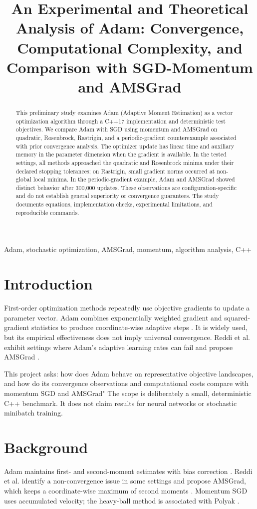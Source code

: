 \documentclass[conference]{IEEEtran}
\title{An Experimental and Theoretical Analysis of Adam: Convergence, Computational Complexity, and Comparison with SGD-Momentum and AMSGrad}
\author{\IEEEauthorblockN{Dario Pomasqui}\IEEEauthorblockA{School of Mathematical and Computational Sciences\\Yachay Tech University\\ECMC1018 Analysis of Algorithms}}
\begin{document}
\maketitle
\begin{abstract}
This preliminary study examines Adam (Adaptive Moment Estimation) as a vector optimization algorithm through a C++17 implementation and deterministic test objectives. We compare Adam with SGD using momentum and AMSGrad on quadratic, Rosenbrock, Rastrigin, and a periodic-gradient counterexample associated with prior convergence analysis. The optimizer update has linear time and auxiliary memory in the parameter dimension when the gradient is available. In the tested settings, all methods approached the quadratic and Rosenbrock minima under their declared stopping tolerances; on Rastrigin, small gradient norms occurred at non-global local minima. In the periodic-gradient example, Adam and AMSGrad showed distinct behavior after 300,000 updates. These observations are configuration-specific and do not establish general superiority or convergence guarantees. The study documents equations, implementation checks, experimental limitations, and reproducible commands.
\end{abstract}
\begin{IEEEkeywords}
Adam, stochastic optimization, AMSGrad, momentum, algorithm analysis, C++
\end{IEEEkeywords}
\section{Introduction}
First-order optimization methods repeatedly use objective gradients to update a parameter vector. Adam combines exponentially weighted gradient and squared-gradient statistics to produce coordinate-wise adaptive steps \cite{kingma}. It is widely used, but its empirical effectiveness does not imply universal convergence. Reddi et al. exhibit settings where Adam's adaptive learning rates can fail and propose AMSGrad \cite{reddi}.

This project asks: how does Adam behave on representative objective landscapes, and how do its convergence observations and computational costs compare with momentum SGD and AMSGrad" The scope is deliberately a small, deterministic C++ benchmark. It does not claim results for neural networks or stochastic minibatch training.
\section{Background}
Adam maintains first- and second-moment estimates with bias correction \cite{kingma}. Reddi et al. identify a non-convergence issue in some settings and propose AMSGrad, which keeps a coordinate-wise maximum of second moments \cite{reddi}. Momentum SGD uses accumulated velocity; the heavy-ball method is associated with Polyak \cite{polyak}.
\end{document}
